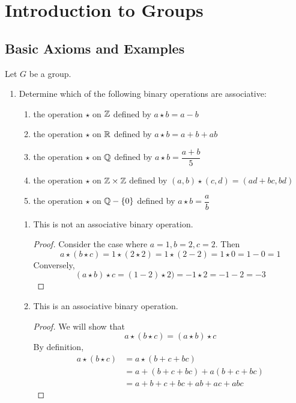 \chapter{Introduction to Groups}
\section{Basic Axioms and Examples}
Let $G$ be a group.
	\begin{enumerate}
		\item Determine which of the following binary operations are associative:
			\begin{enumerate}
				\item the operation $\star$ on $\mathbb{Z}$ defined by $a\star b = a-b$
				\item the operation $\star$ on $\mathbb{R}$ defined by $a\star b =a+b+ab$
				\item the operation $\star$ on $\mathbb{Q}$ defined by $a\star b = \dfrac{a+b}{5}$
				\item the operation $\star$ on $\mathbb{Z}\times\mathbb{Z}$ defined by $(a,b)\star(c,d) = (ad+bc,bd)$
				\item the operation $\star$ on $\mathbb{Q}  - \left\{0\right\}$ defined by $a\star b =\dfrac{a}{b}$
			\end{enumerate}
			\begin{sln}
			\begin{enumerate}
				\item This is not an associative binary operation.
				\begin{proof}
					Consider the case where $a=1, b=2, c=2$.  Then
					$$a\star(b\star c) = 1\star (2\star 2) = 1\star (2-2) = 1 \star 0 = 1-0 = 1$$
					Conversely,
					$$(a\star b)\star c = (1- 2)\star 2) = -1\star 2  = -1 - 2 = -3$$
				\end{proof}
				\item This is an associative binary operation.
					\begin{proof}
						We will show that 
						\[
							a\star(b\star c) = (a\star b)\star c 
						\]
						By definition,
						\begin{align*}
							a\star(b\star c) &= a\star (b+c+bc) \\
							&= a + (b + c + bc)+a(b + c + bc)\\
							&= a+b+c+bc+ab+ac+abc
						\end{align*}
						

\end{proof}
\end{enumerate}
\end{sln}
\end{enumerate}
